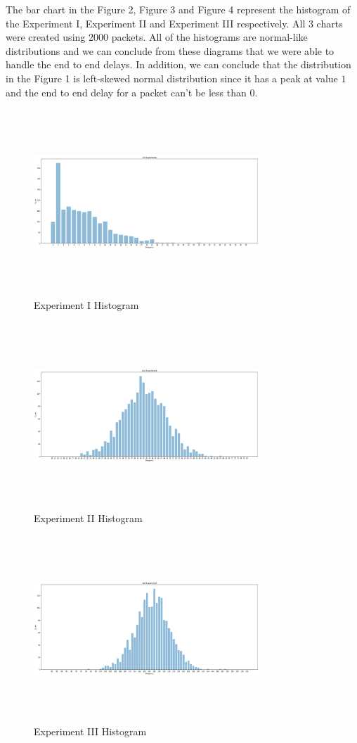 \documentclass[conference]{IEEEtran}
\begin{document}
The bar chart in the Figure 2, Figure 3 and Figure 4 represent the histogram of the Experiment I, Experiment II and Experiment III respectively. All 3 charts were created using 2000 packets. All of the histograms are normal-like distributions and we can conclude from these diagrams that we were able to handle the end to end delays. In addition, we can conclude that the distribution in the Figure 1 is left-skewed normal distribution since it has a peak at value $1$ and the end to end delay for a packet can't be less than 0.

\begin{figure}[t]
\includegraphics[width=8.5cm, height=7cm]{histogram_1.png}
 \caption{Experiment I Histogram}
 \label{fig:1}
\end{figure}

\begin{figure}[t]
\includegraphics[width=8.5cm, height=7cm]{histogram_20.png}
 \caption{Experiment II Histogram}
 \label{fig:1}
\end{figure}

\begin{figure}[t]
\includegraphics[width=8.5cm, height=7cm]{histogram_60.png}
 \caption{Experiment III Histogram}
 \label{fig:1}
\end{figure}
\end{document}
